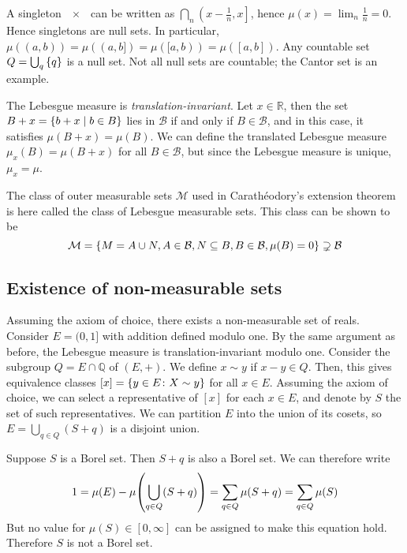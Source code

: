 \begin{remark}
	A singleton \( \qty{x} \) can be written as \( \bigcap_n \left(x-\frac 1n, x\right] \), hence \( \mu({x}) = \lim_n \frac 1n = 0 \).
	Hence singletons are null sets.
	In particular, \( \mu((a,b)) = \mu((a,b]) = \mu([a,b)) = \mu([a,b]) \).
	Any countable set \( Q = \bigcup_q \qty{q} \) is a null set.
	Not all null sets are countable; the Cantor set is an example.

	The Lebesgue measure is \emph{translation-invariant}.
	Let \( x \in \mathbb R \), then the set \( B + x = \qty{b + x \mid b \in B} \) lies in \( \mathcal B \) if and only if \( B \in \mathcal B \), and in this case, it satisfies \( \mu(B + x) = \mu(B) \).
	We can define the translated Lebesgue measure \( \mu_x(B) = \mu(B + x) \) for all \( B \in \mathcal B \), but since the Lebesgue measure is unique, \( \mu_x = \mu \).

	The class of outer measurable sets \( \mathcal M \) used in Carath\'eodory's extension theorem is here called the class of Lebesgue measurable sets.
	This class can be shown to be
	\[ \mathcal M = \qty{ M = A \cup N, A \in \mathcal B, N \subseteq B, B \in \mathcal B, \mu(B) = 0 } \supsetneq \mathcal B \]
\end{remark}

\subsection{Existence of non-measurable sets}
Assuming the axiom of choice, there exists a non-measurable set of reals.
Consider \( E = (0,1] \) with addition defined modulo one.
By the same argument as before, the Lebesgue measure is translation-invariant modulo one.
Consider the subgroup \( Q = E \cap \mathbb Q \) of \( (E, +) \).
We define \( x \sim y \) if \( x - y \in Q \).
Then, this gives equivalence classes \( [x] = \qty{y \in E \colon X \sim y} \) for all \( x \in E \).
Assuming the axiom of choice, we can select a representative of \( [x] \) for each \( x \in E \), and denote by \( S \) the set of such representatives.
We can partition \( E \) into the union of its cosets, so \( E = \bigcup_{q \in Q} (S + q) \) is a disjoint union.

Suppose \( S \) is a Borel set.
Then \( S + q \) is also a Borel set.
We can therefore write
\[ 1 = \mu(E) - \mu\qty(\bigcup_{q \in Q}(S+q)) = \sum_{q \in Q} \mu(S+q) = \sum_{q \in Q} \mu(S) \]
But no value for \( \mu(S) \in [0,\infty] \) can be assigned to make this equation hold.
Therefore \( S \) is not a Borel set.

